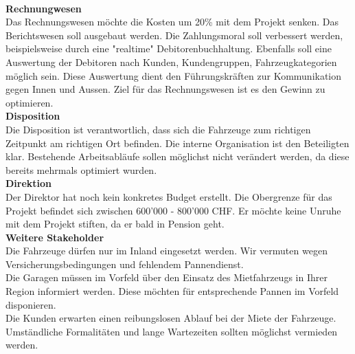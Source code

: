 \\[2ex]
\textbf{Rechnungwesen}\\
Das Rechnungswesen möchte die Kosten um 20\% mit dem Projekt senken. Das Berichtswesen soll ausgebaut werden. Die Zahlungsmoral soll verbessert werden, beispielsweise durch eine "realtime" Debitorenbuchhaltung. Ebenfalls soll eine Auswertung der Debitoren nach Kunden, Kundengruppen, Fahrzeugkategorien möglich sein. Diese Auswertung dient den Führungskräften zur Kommunikation gegen Innen und Aussen. Ziel für das Rechnungswesen ist es den Gewinn zu optimieren.
\\[2ex]
\textbf{Disposition}\\
Die Disposition ist verantwortlich, dass sich die Fahrzeuge zum richtigen Zeitpunkt am richtigen Ort befinden. Die interne Organisation ist den Beteiligten klar. Bestehende Arbeitsabläufe sollen möglichst nicht verändert werden, da diese bereits mehrmals optimiert wurden.
\\[2ex]
\textbf{Direktion}\\
Der Direktor hat noch kein konkretes Budget erstellt. Die Obergrenze für das Projekt befindet sich zwischen 600'000 - 800'000 CHF. Er möchte keine Unruhe mit dem Projekt stiften, da er bald in Pension geht.
\\[2ex]
\textbf{Weitere Stakeholder}\\
Die Fahrzeuge dürfen nur im Inland eingesetzt werden. Wir vermuten wegen Versicherungsbedingungen und fehlendem Pannendienst. \\
Die Garagen müssen im Vorfeld über den Einsatz des Mietfahrzeugs in Ihrer Region informiert werden. Diese möchten für entsprechende Pannen im Vorfeld disponieren. \\
Die Kunden erwarten einen reibungslosen Ablauf bei der Miete der Fahrzeuge. Umständliche Formalitäten und lange Wartezeiten sollten möglichst vermieden werden.